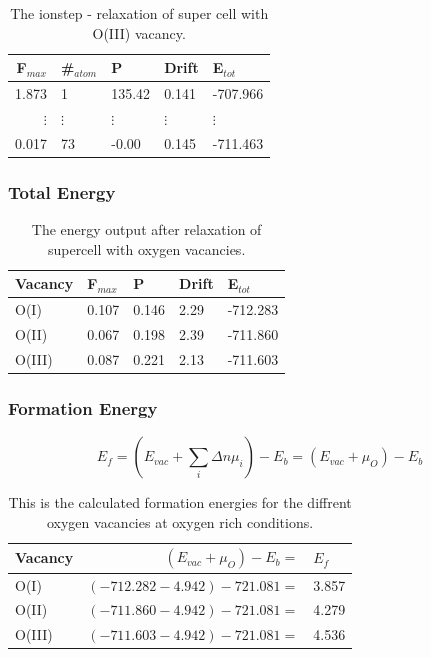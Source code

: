 \begin{table}[H]\caption{The ionstep - relaxation of super cell with O(III) vacancy.}\label{tab:ionstep_O_III}
\begin{tabular}{rllll}
F$_{max}$ &\#$_{atom}$&	P&	Drift&	E$_{tot}$\\ \hline
1.873&	1&	135.42&	0.141&	-707.966	\\
$\vdots$&$\vdots$&$\vdots$&$\vdots$&$\vdots$\\
0.017&	73&	-0.00&	0.145&	-711.463	\\
\end{tabular}
\end{table}

\subsubsection{Total Energy}

\begin{table}[H]\caption{The energy output after relaxation of supercell with oxygen vacancies.}\label{tab:energy_supercell_vacancies}
\begin{tabular}{lllll}
Vacancy& F$_{max}$ &	P&	Drift&	E$_{tot}$ \\ \hline
O(I)&    0.107&	    0.146&	2.29	&    -712.283\\
O(II)&    0.067&	    0.198&	2.39	&    -711.860\\
O(III)&    0.087&    0.221&	2.13	&    -711.603\\
\end{tabular}
\end{table}


\subsubsection{Formation Energy}

$$E_f = (E_{vac} + \sum_i \Delta n \mu_i) - E_b  = (E_{vac}+ \mu_O) - E_b $$

\begin{table}[H]\caption{This is the calculated formation energies for the diffrent oxygen vacancies at oxygen rich conditions.}\label{tab:energy_formation}
\begin{tabular}{lrl}
\footnotesize Vacancy&$(E_{vac} + \mu_O)- E_b = $ &$E_f$ \\ \hline
\small O(I)&$(-712.282 -4.942)-721.081 =$ &3.857\\
\small O(II)&$(-711.860 -4.942)-721.081 =$ &4.279\\
\small O(III)&$(-711.603 -4.942)-721.081 =$ &4.536\\
\end{tabular}
\end{table}

